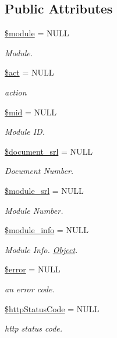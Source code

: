 \subsection*{Public Attributes}
\begin{DoxyCompactItemize}
\item 
\hyperlink{classModuleHandler_a24f28ac6c101582f043bef672a9f3b00}{\$module} = N\+U\+LL
\begin{DoxyCompactList}\small\item\em Module. \end{DoxyCompactList}\item 
\hyperlink{classModuleHandler_ae332c92a6ad1e9e823281d708088a0ff}{\$act} = N\+U\+LL
\begin{DoxyCompactList}\small\item\em action \end{DoxyCompactList}\item 
\hyperlink{classModuleHandler_a6bb7e9e29c0fb9893d051179281b093e}{\$mid} = N\+U\+LL
\begin{DoxyCompactList}\small\item\em Module ID. \end{DoxyCompactList}\item 
\hyperlink{classModuleHandler_acf9f6062042025aab6a7e10f6b261909}{\$document\+\_\+srl} = N\+U\+LL
\begin{DoxyCompactList}\small\item\em Document Number. \end{DoxyCompactList}\item 
\hyperlink{classModuleHandler_ad79751537e64d7bfc7dc6fa4280043b0}{\$module\+\_\+srl} = N\+U\+LL
\begin{DoxyCompactList}\small\item\em Module Number. \end{DoxyCompactList}\item 
\hyperlink{classModuleHandler_a2388e5ef665a5a82efa00c8c894df33c}{\$module\+\_\+info} = N\+U\+LL
\begin{DoxyCompactList}\small\item\em Module Info. \hyperlink{classObject}{Object}. \end{DoxyCompactList}\item 
\hyperlink{classModuleHandler_ad81b78f21e42724e73da6808c561159c}{\$error} = N\+U\+LL
\begin{DoxyCompactList}\small\item\em an error code. \end{DoxyCompactList}\item 
\hyperlink{classModuleHandler_a033e864206ca6a6494af015baa5d2365}{\$http\+Status\+Code} = N\+U\+LL
\begin{DoxyCompactList}\small\item\em http status code. \end{DoxyCompactList}\end{DoxyCompactItemize}


